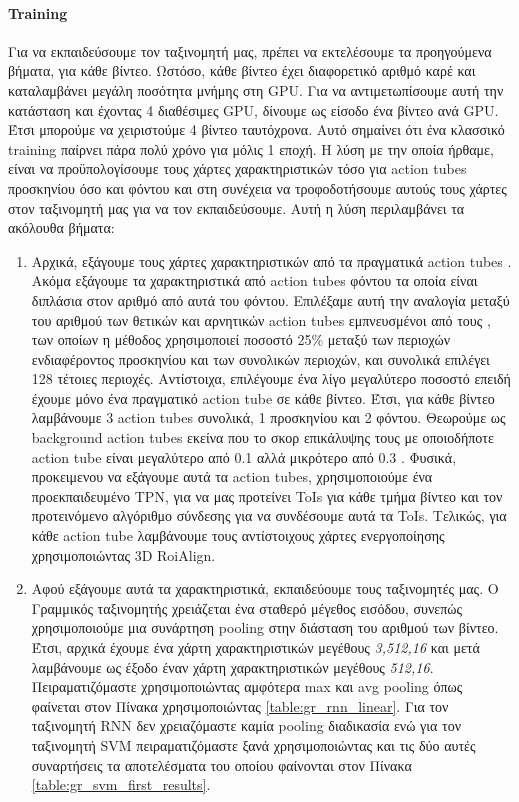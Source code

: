 \paragraph{\en Training\gr}
\gr Για να εκπαιδεύσουμε τον ταξινομητή μας, πρέπει να εκτελέσουμε τα προηγούμενα βήματα,
για κάθε βίντεο. Ωστόσο, κάθε βίντεο έχει διαφορετικό αριθμό καρέ και καταλαμβάνει 
μεγάλη ποσότητα μνήμης στη GPU. Για να αντιμετωπίσουμε αυτή την κατάσταση και έχοντας 4 διαθέσιμες \en GPU\gr, δίνουμε
ως είσοδο ένα βίντεο ανά \en GPU\gr. Έτσι μπορούμε να χειριστούμε 4 βίντεο ταυτόχρονα. Αυτό
σημαίνει ότι ένα κλασσικό \en training \gr παίρνει πάρα πολύ χρόνο για μόλις 1 εποχή.
Η λύση με την οποία ήρθαμε, είναι να προϋπολογίσουμε τους χάρτες χαρακτηριστικών τόσο για \en action tubes \gr
προσκηνίου όσο και φόντου και στη συνέχεια να τροφοδοτήσουμε
αυτούς τους χάρτες στον ταξινομητή μας για να τον εκπαιδεύσουμε.%
Αυτή η λύση περιλαμβάνει τα ακόλουθα βήματα:
\begin{enumerate}
\item Αρχικά, εξάγουμε τους χάρτες χαρακτηριστικών από τα πραγματικά \en action tubes \gr. Ακόμα εξάγουμε τα χαρακτηριστικά από \en
  action tubes \gr φόντου τα οποία είναι διπλάσια στον αριθμό από αυτά του φόντου. Επιλέξαμε αυτή την αναλογία μεταξύ του αριθμού των
  θετικών και αρνητικών \en action tubes \gr εμπνευσμένοι από τους \en\cite{jjfaster2rcnn}\gr, των οποίων η μέθοδος χρησιμοποιεί ποσοστό
  25\% μεταξύ των περιοχών ενδιαφέροντος προσκηνίου και των συνολικών περιοχών, και συνολικά επιλέγει 128 τέτοιες περιοχές. Αντίστοιχα,
  επιλέγουμε ένα λίγο μεγαλύτερο ποσοστό επειδή έχουμε μόνο ένα πραγματικό \en action tube \gr σε κάθε βίντεο. Έτσι, για κάθε βίντεο
  λαμβάνουμε 3 \en action tubes \gr συνολικά, 1 προσκηνίου και 2 φόντου. Θεωρούμε ως \en background action tubes \gr εκείνα που το σκορ
  επικάλυψης τους με οποιοδήποτε \en action tube \gr είναι μεγαλύτερο από 0.1 αλλά μικρότερο από 0.3 . Φυσικά, προκειμενου να εξάγουμε αυτά
  τα \en action tubes\gr, χρησιμοποιούμε ένα  προεκπαιδευμένο \en TPN, \gr για να μας προτείνει \en ToIs \gr για κάθε τμήμα βίντεο και
  τον προτεινόμενο αλγόριθμο σύνδεσης για να συνδέσουμε αυτά τα \en ToIs\gr. Τελικώς, για κάθε \en action tube \gr λαμβάνουμε
  τους αντίστοιχους χάρτες ενεργοποίησης χρησιμοποιώντας \en 3D RoiAlign. \gr
\item Αφού εξάγουμε αυτά τα χαρακτηριστικά, εκπαιδεύουμε τους ταξινομητές μας. Ο Γραμμικός ταξινομητής χρειάζεται ένα σταθερό μέγεθος
  εισόδου, συνεπώς χρησιμοποιούμε μια συνάρτηση \en pooling \gr στην διάσταση του αριθμού των βίντεο. Έτσι, αρχικά έχουμε ένα
  χάρτη χαρακτηριστικών μεγέθους \textit{3,512,16} και μετά λαμβάνουμε ως έξοδο έναν χάρτη χαρακτηριστικών μεγέθους \textit{512,16}.
  Πειραματιζόμαστε χρησιμοποιώντας αμφότερα \en max \gr και \en avg pooling \gr όπως φαίνεται στον Πίνακα χρησιμοποιώντας  \ref{table:gr_rnn_linear}. Για τον ταξινομητή \en RNN \gr δεν χρειαζόμαστε καμία \en pooling \gr διαδικασία ενώ για τον ταξινομητή \en SVM \gr
  πειραματιζόμαστε ξανά χρησιμοποιώντας   και τις δύο αυτές συναρτήσεις τα αποτελέσματα του οποίου φαίνονται στον Πίνακα \ref{table:gr_svm_first_results}.
\end{enumerate}
